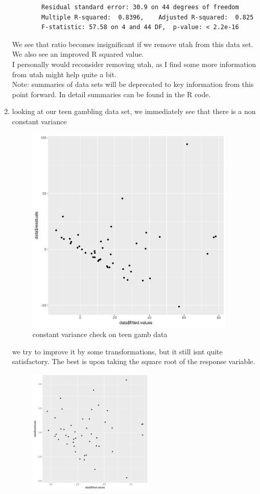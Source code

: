 \documentclass[11pt]{article}
\begin{document}
\begin{enumerate}
\begin{verbatim}
		Residual standard error: 30.9 on 44 degrees of freedom
		Multiple R-squared:  0.8396,	Adjusted R-squared:  0.825 
		F-statistic: 57.58 on 4 and 44 DF,  p-value: < 2.2e-16
	\end{verbatim}
	We see that ratio becomes insignificant if we remove utah from this data set. We also see an improved R squared value.
	\\
	I personally would reconsider removing utah, as I find some more information from utah might help quite a bit.
	\\
	Note: summaries of data sets will be deprecated to key information from this point forward. In detail summaries can be found in the R code.
	\item
	looking at our teen gambling data set, we immediately see that there is a non constant variance
	\begin{figure}[H]
		\centering
		\includegraphics[width=10cm,height=10cm]{teengambcv.pdf}
		\caption[teengambcv]{constant variance check on teen gamb data}
		\label{CV check on teen gamb}
	\end{figure}
	we try to improve it by some transformations, but it still isnt quite satisfactory. The best is upon taking the square root of the response variable.
	\begin{figure}[H]
		\centering
		\includegraphics[width=6cm,height=6cm]{teengambcv2.pdf}

\end{figure}
\end{enumerate}
\end{document}
